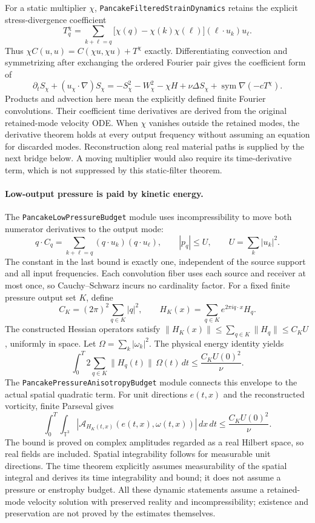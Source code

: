 \documentclass[11pt]{article}
\theoremstyle{definition}
\begin{document}
For a static multiplier $\chi$, \texttt{PancakeFilteredStrainDynamics}
retains the explicit stress-divergence coefficient
\[
 T^\chi_q=\sum_{k+\ell=q}
  \bigl[\chi(q)-\chi(k)\chi(\ell)\bigr](\ell\cdot u_k)u_\ell.
\]
Thus $\chi C(u,u)=C(\chi u,\chi u)+T^\chi$ exactly. Differentiating
convection and symmetrizing after exchanging the ordered Fourier pair
gives the coefficient form of
\[
 \partial_t S_\chi+(u_\chi\cdot\nabla)S_\chi
 =-S_\chi^2-W_\chi^2-\chi H
   +\nu\Delta S_\chi+\operatorname{sym}\nabla(-cT^\chi).
\]
Products and advection here mean the explicitly defined finite Fourier
convolutions. Their coefficient time derivatives are derived from the
original retained-mode velocity ODE. When $\chi$ vanishes outside the
retained modes, the derivative theorem holds at every output frequency
without assuming an equation for discarded modes. Reconstruction along
real material paths is supplied by the next bridge below. A moving multiplier would
also require its time-derivative term, which is not suppressed by this
static-filter theorem.

\paragraph{Low-output pressure is paid by kinetic energy.}
The \texttt{PancakeLowPressureBudget} module uses incompressibility to
move both numerator derivatives to the output mode:
\[
 q\cdot C_q=\sum_{k+\ell=q}(q\cdot u_k)(q\cdot u_\ell),\qquad
 |p_q|\le U,\qquad U=\sum_k|u_k|^2.
\]
The constant in the last bound is exactly one, independent of the
source support and all input frequencies. Each convolution fiber uses
each source and receiver at most once, so Cauchy--Schwarz incurs no
cardinality factor. For a fixed finite pressure output set $K$, define
\[
 C_K=(2\pi)^2\sum_{q\in K}|q|^2,\qquad
 H_K(x)=\sum_{q\in K}e^{2\pi i q\cdot x}H_q.
\]
The constructed Hessian operators satisfy
$\|H_K(x)\|\le\sum_{q\in K}\|H_q\|\le C_K U$, uniformly in space.
Let $\Omega=\sum_k|\omega_k|^2$. The physical energy identity yields
\[
 \int_0^T 2\!\sum_{q\in K}\|H_q(t)\|\,\Omega(t)\,dt
 \le \frac{C_K U(0)^2}{\nu}.
\]
The \texttt{PancakePressureAnisotropyBudget} module connects this envelope
to the actual spatial quadratic term. For unit directions $e(t,x)$ and
the reconstructed vorticity, finite Parseval gives
\[
 \int_0^T\!\int_{\mathbb T^3}
  |\mathcal A_{H_K(t,x)}(e(t,x),\omega(t,x))|\,dx\,dt
 \le \frac{C_K U(0)^2}{\nu}.
\]
The bound is proved on complex amplitudes regarded as a real Hilbert
space, so real fields are included. Spatial integrability follows for
measurable unit directions. The time theorem explicitly assumes
measurability of the spatial integral and derives its time integrability
and bound; it does not assume a pressure or enstrophy budget.
All these dynamic statements assume a retained-mode velocity solution
with preserved reality and incompressibility; existence and preservation
are not proved by the estimates themselves.
\end{document}

